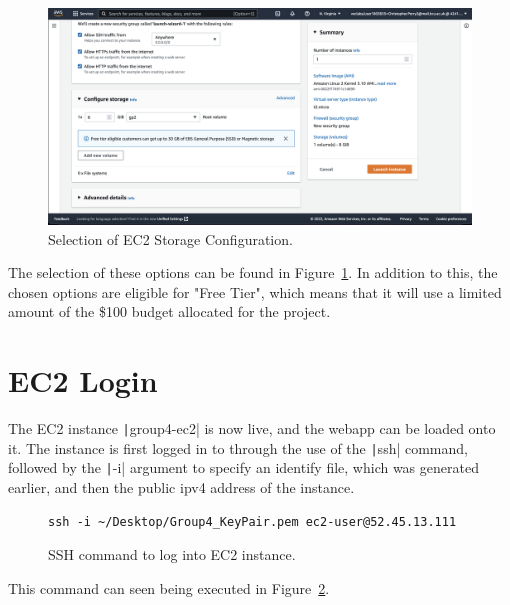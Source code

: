 \begin{figure}[!htbp]
    \centering
    \includegraphics[scale=0.3]{resources/ec2/create-instance-configure-storage}
    \caption{Selection of EC2 Storage Configuration.}
    \label{fig:ec2-storage}
\end{figure}

The selection of these options can be found in Figure~\ref{fig:ec2-storage}.
In addition to this, the chosen options are eligible for "Free Tier", which means that it will use a limited amount of the
\$100 budget allocated for the project.

\section{EC2 Login}\label{sec:webapp-setup}

The EC2 instance \texttt|group4-ec2| is now live, and the webapp can be loaded onto it.
The instance is first logged in to through the use of the \texttt|ssh| command, followed by the
\texttt|-i| argument to specify an identify file, which was generated earlier, and then the public ipv4 address
of the instance.

\begin{figure}[!htbp]
    \centering
    \begin{verbatim}
ssh -i ~/Desktop/Group4_KeyPair.pem ec2-user@52.45.13.111
    \end{verbatim}
    \caption{SSH command to log into EC2 instance.}\label{fig:ssh-login}
\end{figure}

This command can seen being executed in Figure~\ref{fig:ssh-login}.

